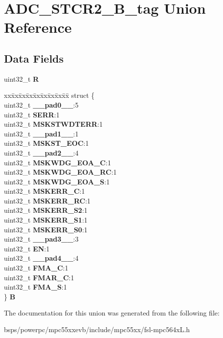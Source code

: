 \hypertarget{unionADC__STCR2__32B__tag}{}\section{A\+D\+C\+\_\+\+S\+T\+C\+R2\+\_\+B\+\_\+tag Union Reference}
\label{unionADC__STCR2__32B__tag}
\subsection*{Data Fields}
\begin{DoxyCompactItemize}
\item 
\mbox{\label{unionADC__STCR2__32B__tag_a12348f74635c90e0081b61e558d13583}} 
uint32\+\_\+t {\bfseries R}
\item 
\mbox{\label{unionADC__STCR2__32B__tag_a34c26a34a93bbb562ff75b32af76ae45}} 
\begin{tabbing}
xx\=xx\=xx\=xx\=xx\=xx\=xx\=xx\=xx\=\kill
struct \{\\
\>uint32\_t {\bfseries \_\_pad0\_\_}:5\\
\>uint32\_t {\bfseries SERR}:1\\
\>uint32\_t {\bfseries MSKSTWDTERR}:1\\
\>uint32\_t {\bfseries \_\_pad1\_\_}:1\\
\>uint32\_t {\bfseries MSKST\_EOC}:1\\
\>uint32\_t {\bfseries \_\_pad2\_\_}:4\\
\>uint32\_t {\bfseries MSKWDG\_EOA\_C}:1\\
\>uint32\_t {\bfseries MSKWDG\_EOA\_RC}:1\\
\>uint32\_t {\bfseries MSKWDG\_EOA\_S}:1\\
\>uint32\_t {\bfseries MSKERR\_C}:1\\
\>uint32\_t {\bfseries MSKERR\_RC}:1\\
\>uint32\_t {\bfseries MSKERR\_S2}:1\\
\>uint32\_t {\bfseries MSKERR\_S1}:1\\
\>uint32\_t {\bfseries MSKERR\_S0}:1\\
\>uint32\_t {\bfseries \_\_pad3\_\_}:3\\
\>uint32\_t {\bfseries EN}:1\\
\>uint32\_t {\bfseries \_\_pad4\_\_}:4\\
\>uint32\_t {\bfseries FMA\_C}:1\\
\>uint32\_t {\bfseries FMAR\_C}:1\\
\>uint32\_t {\bfseries FMA\_S}:1\\
\} {\bfseries B}\\

\end{tabbing}\end{DoxyCompactItemize}


The documentation for this union was generated from the following file\+:\begin{DoxyCompactItemize}
\item 
bsps/powerpc/mpc55xxevb/include/mpc55xx/fsl-\/mpc564x\+L.\+h\end{DoxyCompactItemize}
